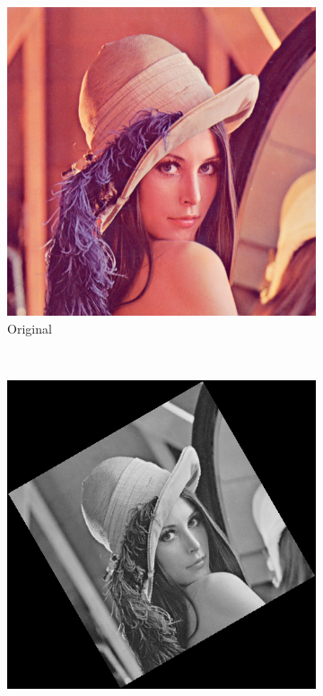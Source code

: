 \begin{figure}[htbp]
	\centering
	\begin{subfigure}[t]{0.5\textwidth}
	    \centering
		\includegraphics[width=\textwidth]{hw2/problem1/Lenna.png}
		\caption{Original}\label{fig:4a}
	\end{subfigure}\\
	\begin{subfigure}[t]{0.4\textwidth}
	    \centering
		\includegraphics[width=\textwidth]{hw2/problem1/lena.png}

\end{subfigure}
\end{figure}

